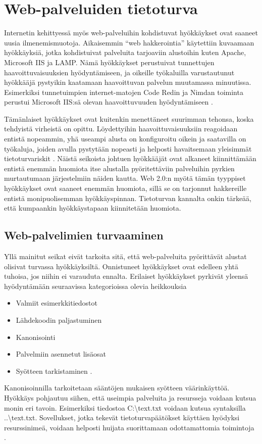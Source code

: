 \newpage

\section{Web-palveluiden tietoturva}

Internetin kehittyessä myös web-palveluihin kohdistuvat hyökkäykset ovat saaneet
uusia ilmenemismuotoja. Aikaisemmin ``web hakkerointia'' käytettiin kuvaamaan
hyökkäyksiä, jotka kohdistuivat palveluita tarjoaviin alustoihin kuten Apache, 
Microsoft IIS ja LAMP. Nämä hyökkäykset perustuivat tunnettujen haavoittuvaisuuksien
hyödyntämiseen, ja oikeille työkaluilla varustautunut hyökkääjä pystyikin kaatamaan haavoittuvan
palvelun muutamassa minuutissa. Esimerkiksi tunnetuimpien internet-matojen Code Redin ja Nimdan toiminta
perustui Microsoft IIS:sä olevan haavoittuvuuden hyödyntämiseen \cite{Hacking}. 

Tämänlaiset hyökkäykset ovat kuitenkin menettäneet suurimman tehonsa, koska tehdyistä virheistä on opittu. Löydettyihin 
haavoittuvaisuuksiin reagoidaan entistä nopeammin, yhä useampi alusta on konfiguroitu oikein ja saatavilla on työkaluja, joiden
avulla pystytään nopeasti ja helposti havaitsemaan yleisimmät tietoturvariskit \cite{Hacking}. Näistä seikoista johtuen
hyökkääjät ovat alkaneet kiinnittämään entistä enemmän huomiota itse alustalla pyöritettäviin palveluihin pyrkien 
murtautumaan järjestelmiin näiden kautta. Web 2.0:n myötä tämän tyyppiset hyökkäykset ovat saaneet
enemmän huomiota, sillä se on tarjonnut hakkereille entistä monipuolisemman hyökkäyspinnan. Tietoturvan 
kannalta onkin tärkeää, että kumpaankin hyökkäystapaan kiinnitetään huomiota.

\subsection{Web-palvelimien turvaaminen}

Yllä mainitut seikat eivät tarkoita sitä, että web-palveluita pyörittävät alustat olisivat
turvassa hyökkäyksiltä. Onnistuneet hyökkäykset ovat edelleen yhtä tuhoisa, jos niihin ei varauduta ennalta.
Erilaiset hyökkäykset pyrkivät yleensä hyödyntämään seuraavissa kategorioissa olevia heikkouksia

\begin{itemize}
\item Valmiit esimerkkitiedostot
\item Lähdekoodin paljastuminen
\item Kanonisointi
\item Palvelmiin asennetut lisäosat
\item Syötteen tarkistaminen \cite{Hacking}.
\end{itemize}
Kanonisoinnilla tarkoitetaan sääntöjen mukaisen syötteen väärinkäyttöä. Hyökkäys pohjautuu siihen,
että useimpia palveluita ja resursseja voidaan kutsua monin eri tavoin. Esimerkiksi tiedostoa C:\textbackslash text.txt voidaan 
kutsua syntaksilla ..\textbackslash text.txt. Sovellukset, jotka tekevät tietoturvapäätökset käyttäen hyödyksi resurssinimeä,
voidaan helposti huijata suorittamaan odottamattomia toimintoja \cite{Hacking}.

